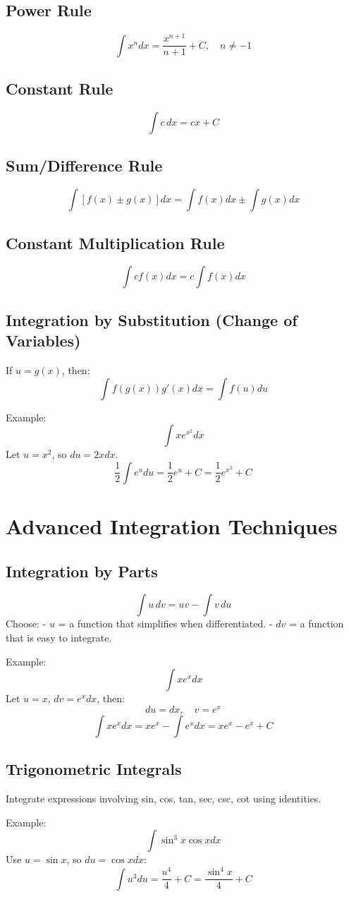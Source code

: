 \documentclass{article}
\begin{document}
\subsection{Power Rule}
\[
\int x^n dx = \frac{x^{n+1}}{n+1} + C, \quad n \neq -1
\]
\subsection{Constant Rule}
\[
\int c \, dx = cx + C
\]
\subsection{Sum/Difference Rule}
\[
\int [f(x) \pm g(x)] dx = \int f(x) dx \pm \int g(x) dx
\]
\subsection{Constant Multiplication Rule}
\[
\int c f(x) dx = c \int f(x) dx
\]
\subsection{Integration by Substitution (Change of Variables)}
If \( u = g(x) \), then:
\[
\int f(g(x)) g'(x) dx = \int f(u) du
\]

Example:
\[
\int x e^{x^2} dx
\]
Let \( u = x^2 \), so \( du = 2x dx \).
\[
\frac{1}{2} \int e^u du = \frac{1}{2} e^u + C = \frac{1}{2} e^{x^2} + C
\]
\newpage
\section{Advanced Integration Techniques}
\subsection{Integration by Parts}
\[
\int u \, dv = uv - \int v \, du
\]
Choose:
- \( u \) = a function that simplifies when differentiated.
- \( dv \) = a function that is easy to integrate.

Example:
\[
\int x e^x dx
\]
Let \( u = x \), \( dv = e^x dx \), then:
\[
du = dx, \quad v = e^x
\]
\[
\int x e^x dx = x e^x - \int e^x dx = x e^x - e^x + C
\]

\subsection{Trigonometric Integrals}
Integrate expressions involving sin, cos, tan, sec, csc, cot using identities.

Example:
\[
\int \sin^3 x \cos x dx
\]
Use \( u = \sin x \), so \( du = \cos x dx \):
\[
\int u^3 du = \frac{u^4}{4} + C = \frac{\sin^4 x}{4} + C
\]
\end{document}
